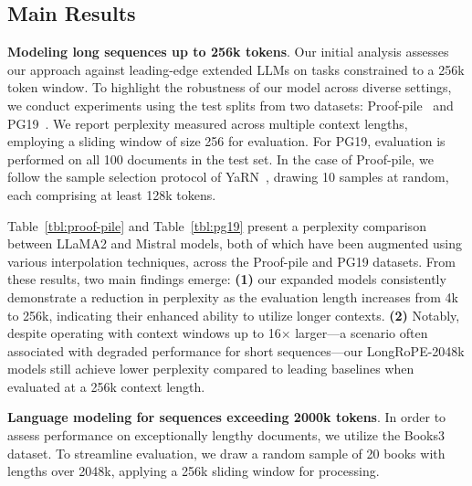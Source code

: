 \subsection{Main Results}

\label{sec:mainresult}
\textbf{Modeling long sequences up to 256k tokens}. Our initial analysis assesses our approach against leading-edge extended LLMs on tasks constrained to a 256k token window. To highlight the robustness of our model across diverse settings, we conduct experiments using the test splits from two datasets: Proof-pile~\cite{pg19} and PG19~\cite{pile}. We report perplexity measured across multiple context lengths, employing a sliding window of size 256 for evaluation. For PG19, evaluation is performed on all 100 documents in the test set. In the case of Proof-pile, we follow the sample selection protocol of YaRN~\cite{yarn}, drawing 10 samples at random, each comprising at least 128k tokens.

Table~\ref{tbl:proof-pile} and Table~\ref{tbl:pg19} present a perplexity comparison between LLaMA2 and Mistral models, both of which have been augmented using various interpolation techniques, across the Proof-pile and PG19 datasets. From these results, two main findings emerge: \textbf{(1)} our expanded models consistently demonstrate a reduction in perplexity as the evaluation length increases from 4k to 256k, indicating their enhanced ability to utilize longer contexts. \textbf{(2)} Notably, despite operating with context windows up to 16$\times$ larger—a scenario often associated with degraded performance for short sequences—our LongRoPE-2048k models still achieve lower perplexity compared to leading baselines when evaluated at a 256k context length.

\textbf{Language modeling for sequences exceeding 2000k tokens}. In order to assess performance on exceptionally lengthy documents, we utilize the Books3~\cite{pile} dataset. To streamline evaluation, we draw a random sample of 20 books with lengths over 2048k, applying a 256k sliding window for processing.

